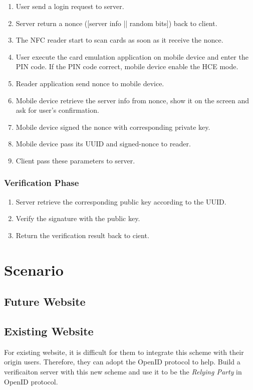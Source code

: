 \begin{CJK}{Bg5}{bsmi}
\begin{enumerate}
\item User send a login request to server.
\item Server return a nonce ([server info || random bits]) back to client.
\item The NFC reader start to scan cards as soon as it receive the nonce.
\item User execute the card emulation application on mobile device and enter the PIN code. If the PIN code correct, mobile device enable the HCE mode.
\item Reader application send nonce to mobile device.
\item Mobile device retrieve the server info from nonce, show it on the screen and ask for user's confirmation.
\item Mobile device signed the nonce with corresponding private key.
\item Mobile device pass its UUID and signed-nonce to reader.
\item Client pass these parameters to server.
\end{enumerate}

\subsubsection{Verification Phase}

\begin{enumerate}
\item Server retrieve the corresponding public key according to the UUID.
\item Verify the signature with the public key.
\item Return the verification result back to cient.
\end{enumerate}

\section{Scenario}

\subsection{Future Website}
\label{sec:future-website}

\subsection{Existing Website}

For existing website, it is difficult for them to integrate this scheme with their origin users. Therefore, they can adopt the OpenID protocol to help. Build a verificaiton server with this new scheme and use it to be the \emph{Relying Party} in OpenID protocol.


\end{CJK}
